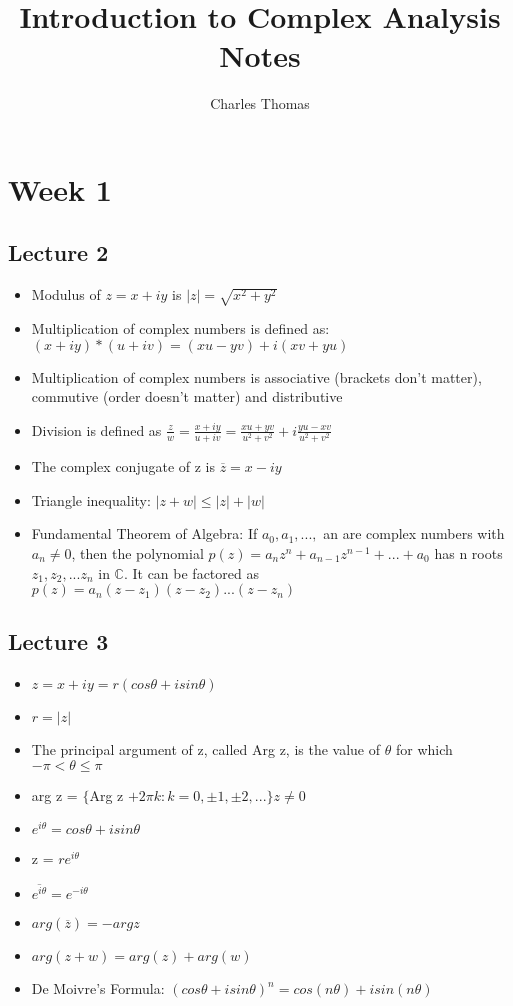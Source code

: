 \documentclass[a4paper]{article}
\title{Introduction to Complex Analysis Notes}
\author{Charles Thomas}
\begin{document}
\maketitle

\section{Week 1}
\subsection{Lecture 2}
\begin{itemize}
\item Modulus of $z = x + iy$ is $|z| = \sqrt{x^2+y^2}$
\item Multiplication of complex numbers is defined as: $(x + iy)*(u + iv) = (xu - yv) + i(xv + yu)$
\item Multiplication of complex numbers is associative (brackets don't matter), commutive (order doesn't matter) and distributive
\item Division is defined as $\frac{z}{w} = \frac{x +iy}{u+iv} = \frac{xu + yv}{u^2 + v^2} + i\frac{yu - xv}{u^2 + v^2}$
\item The complex conjugate of z is $\overline{z} = x - iy$
\item Triangle inequality: $|z+w| \leq |z| + |w|$
\item Fundamental Theorem of Algebra: If $a_0, a_1, . . . ,$ an are complex numbers with $a_n \neq 0$, then the polynomial $p(z) = a_nz^n + a_{n-1}z^{n-1} + ... + a_0$ has n roots $z_1, z_2, . . . z_n$ in $\mathbb{C}$. It can be factored as $p(z) = a_n(z -z_1)(z - z_2)...(z -z_n)$
\end{itemize} 

\subsection{Lecture 3}
\begin{itemize}
\item $z = x + iy = r(cos \theta + i sin \theta)$
\item $r = |z|$
\item The principal argument of z, called Arg z, is the value of $\theta$ for which $-\pi < \theta \leq \pi$
\item arg z = $\{$Arg z $+ 2\pi k : k = 0,\pm1, \pm2, . . .\} z\neq 0$
\item $e^{i\theta} = cos \theta + isin\theta$
\item z = $re^{i\theta}$
\item $\overline{e^{i\theta}} = e^{-i\theta}$
\item $arg(\overline{z}) = -arg z$
\item $arg(z+w) = arg(z)+arg(w)$
\item De Moivre's Formula: $(cos \theta + i sin \theta)^n = cos(n\theta) + i sin(n\theta)$
\end{itemize} 
\end{document}
